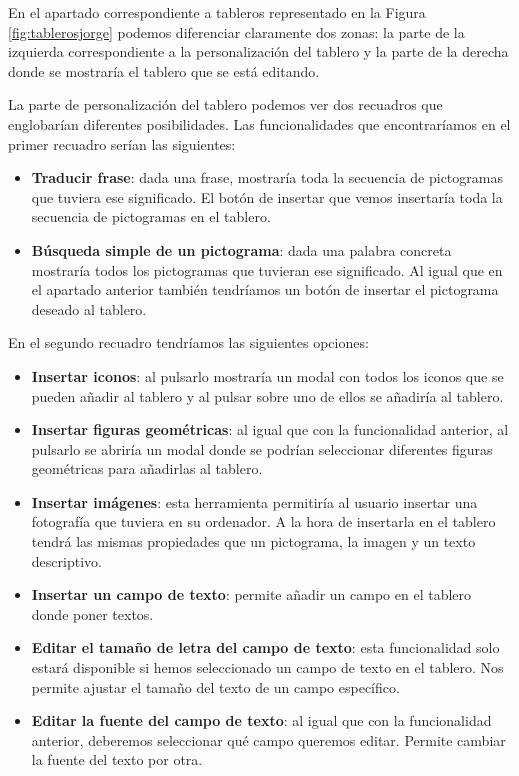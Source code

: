 	
	En el apartado correspondiente a tableros representado en la Figura \ref{fig:tablerosjorge} podemos diferenciar claramente dos zonas: la parte de la izquierda correspondiente a la personalización del tablero y la parte de la derecha donde se mostraría el tablero que se está editando.
	
	
	La parte de personalización del tablero podemos ver dos recuadros que englobarían diferentes posibilidades. Las funcionalidades que encontraríamos en el primer recuadro serían las siguientes:
	
	\begin{itemize}
		\item \textbf{Traducir frase}: dada una frase, mostraría toda la secuencia de pictogramas que tuviera ese significado. El botón de insertar que vemos insertaría toda la secuencia de pictogramas en el tablero.
		
		\item \textbf{Búsqueda simple de un pictograma}: dada una palabra concreta mostraría todos los pictogramas que tuvieran ese significado. Al igual que en el apartado anterior también tendríamos un botón de insertar el pictograma deseado al tablero.
	
	\end{itemize}

En el segundo recuadro tendríamos las siguientes opciones:

	\begin{itemize}
	
		\item \textbf{Insertar iconos}: al pulsarlo mostraría un modal con todos los iconos que se pueden añadir al tablero y al pulsar sobre uno de ellos se añadiría al tablero.
		
		\item \textbf{Insertar figuras geométricas}: al igual que con la funcionalidad anterior, al pulsarlo se abriría un modal donde se podrían seleccionar diferentes figuras geométricas para añadirlas al tablero.
		
		\item \textbf{Insertar imágenes}: esta herramienta permitiría al usuario insertar una fotografía que tuviera en su ordenador. A la hora de insertarla en el tablero tendrá las mismas propiedades que un pictograma, la imagen y un texto descriptivo.
		
		\item \textbf{Insertar un campo de texto}: permite añadir un campo en el tablero donde poner textos.
		
		\item \textbf{Editar el tamaño de letra del campo de texto}: esta funcionalidad solo estará disponible si hemos seleccionado un campo de texto en el tablero. Nos permite ajustar el tamaño del texto de un campo específico.
		
		\item \textbf{Editar la fuente del campo de texto}: al igual que con la funcionalidad anterior, deberemos seleccionar qué campo queremos editar. Permite cambiar la fuente del texto por otra.
		
	\end{itemize}
	
